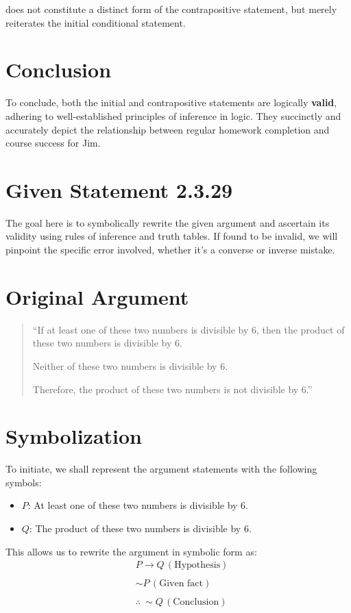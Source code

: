 \documentclass[12pt]{article}
\begin{document}
does not constitute a distinct form of the contrapositive statement, but merely reiterates the initial conditional statement.

\section*{Conclusion}
To conclude, both the initial and contrapositive statements are logically {\bf{valid}}, adhering to well-established principles of inference in logic. They succinctly and accurately depict the relationship between regular homework completion and course success for Jim.

\section*{Given Statement 2.3.29}
The goal here is to symbolically rewrite the given argument and ascertain its validity using rules of inference and truth tables. If found to be invalid, we will pinpoint the specific error involved, whether it's a converse or inverse mistake.

\section*{Original Argument}
\begin{quote}
“If at least one of these two numbers is divisible by 6, then the product of these two numbers is divisible by 6.

Neither of these two numbers is divisible by 6.

Therefore, the product of these two numbers is not divisible by 6.”
\end{quote}

\section*{Symbolization}
To initiate, we shall represent the argument statements with the following symbols:
\begin{itemize}
    \item \( P \): At least one of these two numbers is divisible by 6.
    \item \( Q \): The product of these two numbers is divisible by 6.
\end{itemize}

This allows us to rewrite the argument in symbolic form as:
\[
\begin{aligned}
& P \rightarrow Q \, (\text{Hypothesis}) \\ \\
& \sim P \, (\text{Given fact}) \\ \\
& \therefore \ \sim Q \, (\text{Conclusion}) \\ 
\end{aligned}
\]
\end{document}
